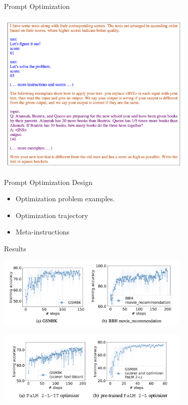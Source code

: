 \documentclass[aspectratio=1610,xcolor={dvipsnames},hyperref={colorlinks,unicode,linkcolor=violet,anchorcolor=BlueViolet,citecolor=YellowOrange,filecolor=black,urlcolor=Aquamarine}]{beamer}
\begin{document}
\begin{frame}[label={sec:org34b61c0}]{Prompt Optimization}
\begin{center}
\includegraphics[height=8cm]{./p5.png}
\end{center}
\end{frame}
\begin{frame}[label={sec:org6a71f6a}]{Prompt Optimization Design}
\begin{itemize}
\item Optimization problem examples.
\item Optimization trajectory
\item Meta-instructions
\end{itemize}
\end{frame}
\begin{frame}[label={sec:orgce30a87}]{Results}
\begin{center}
\includegraphics[height=3.5cm]{./p6.png}
\end{center}

\begin{center}
\includegraphics[height=3.5cm]{./p7.png}
\end{center}
\end{frame}
\end{document}
